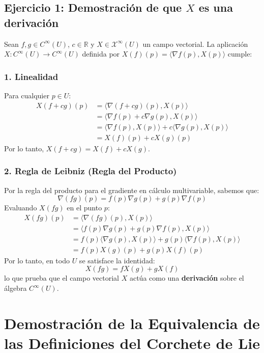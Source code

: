 \documentclass[11pt,a4paper]{article}
\theoremstyle{definition}
\theoremstyle{plain}
\theoremstyle{remark}
\begin{document}
	\subsection*{Ejercicio 1: Demostración de que $X$ es una derivación}
	
	Sean $f, g \in C^\infty(U)$, $c \in \mathbb{R}$ y $X \in \mathcal{X}^\infty(U)$ un campo vectorial. La aplicación $X : C^\infty(U) \to C^\infty(U)$ definida por $X(f)(p) = \langle \nabla f(p), X(p) \rangle$ cumple:
	
	\subsubsection*{1. Linealidad}
	Para cualquier $p \in U$:
	\[
	\begin{aligned}
		X(f + c g)(p) &= \langle \nabla(f + cg)(p), X(p) \rangle \\
		&= \langle \nabla f(p) + c \nabla g(p), X(p) \rangle \\
		&= \langle \nabla f(p), X(p) \rangle + c \langle \nabla g(p), X(p) \rangle \\
		&= X(f)(p) + c X(g)(p)
	\end{aligned}
	\]
	Por lo tanto, $X(f + cg) = X(f) + c X(g)$.
	
	\subsubsection*{2. Regla de Leibniz (Regla del Producto)}
	Por la regla del producto para el gradiente en cálculo multivariable, sabemos que:
	\[
	\nabla(fg)(p) = f(p) \nabla g(p) + g(p) \nabla f(p)
	\]
	Evaluando $X(fg)$ en el punto $p$:
	\[
	\begin{aligned}
		X(fg)(p) &= \langle \nabla(fg)(p), X(p) \rangle \\
		&= \langle f(p) \nabla g(p) + g(p) \nabla f(p), X(p) \rangle \\
		&= f(p) \langle \nabla g(p), X(p) \rangle + g(p) \langle \nabla f(p), X(p) \rangle \\
		&= f(p) X(g)(p) + g(p) X(f)(p)
	\end{aligned}
	\]
	Por lo tanto, en todo $U$ se satisface la identidad:
	\[
	X(fg) = f X(g) + g X(f)
	\]
	lo que prueba que el campo vectorial $X$ actúa como una \textbf{derivación} sobre el álgebra $C^\infty(U)$.
	
	\section*{Demostración de la Equivalencia de las Definiciones del Corchete de Lie}
	
\end{document}
